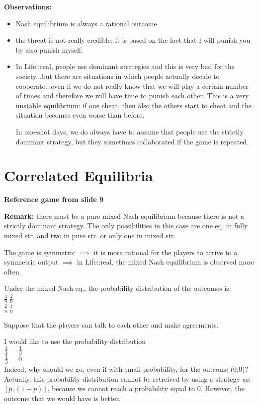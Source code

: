 \bigskip
\noindent \textbf{Observations:}
\begin{itemize}
	\item Nash equilibrium is always a rational outcome.

	\item the threat is not really credible: 
	it is based on the fact that I will punish you by also punish myself.
	
	\item In Life::real, people use dominant strategies and this is very bad 
	for the society...but there are situations in which people actually decide to 
	cooperate...even if we do not really know that we will play a certain 
	number of times and therefore we will have time to punish each other. This is 
	a very unstable equilibrium: if one cheat, then also the others start to cheat 
	and the situation becomes even worse than before.

	\noindent In one-shot days, we do always have to assume that people use the 
	strictly dominant strategy, but they sometimes collaborated if the game is 
	repeated.
\end{itemize}

\section{Correlated Equilibria}

\bigskip
\noindent \textbf{Reference game from slide 9}

\noindent \textbf{Remark:} there must be a pure mixed Nash equilibrium because 
there is not a strictly dominant strategy. The only possibilities in this case 
are one eq. in fully mixed str. and two in pure str. or only one in mixed str.

\noindent The game is symmetric $\implies$ it is more rational for the 
players to arrive to a symmetric output $\implies$ in Life::real, the mixed 
Nash equilibrium is observed more often.

\noindent Under the mixed Nash eq., the probability distribution of the 
outcomes is:\\
$\frac{4}{9}$	$\frac{2}{9}$\\
$\frac{2}{9}$	$\frac{1}{9}$

\bigskip
\noindent Suppose that the players can talk to each other and make agreements.

\noindent I would like to use the probability distribution\\
$\frac{1}{3} \hspace{.5cm} \frac{1}{3}$\\
$\frac{1}{3} \hspace{.5cm} 0$\\
Indeed, why should we 
go, even if with small probability, for the outcome (0,0)? Actually, this 
probability distribution cannot be retreived by using a strategy as: 
$[p,(1-p)]$, because we cannot reach a probability equal to 0. However, the 
outcome that we would have is better.

